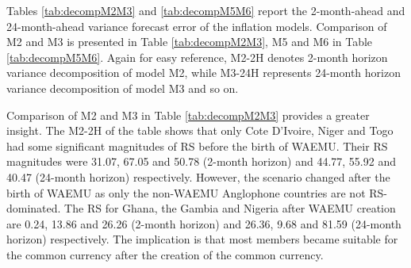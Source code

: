 \documentclass[]{article}
\begin{document}
Tables \ref{tab:decompM2M3} and \ref{tab:decompM5M6} report the 2-month-ahead and 24-month-ahead variance forecast error of the inflation models. Comparison of M2 and M3 is presented in Table \ref{tab:decompM2M3}, M5 and M6 in Table \ref{tab:decompM5M6}. Again for easy reference, M2-2H denotes 2-month horizon variance decomposition of model M2, while M3-24H represents 24-month horizon variance decomposition of model M3 and so on.

Comparison of M2 and M3 in Table \ref{tab:decompM2M3} provides a greater insight. The M2-2H of the table shows that only Cote D'Ivoire, Niger and Togo had some significant magnitudes of RS before the birth of WAEMU. Their RS magnitudes were 31.07, 67.05 and 50.78 (2-month horizon) and 44.77, 55.92 and 40.47 (24-month horizon) respectively. However, the scenario changed after the birth of WAEMU as only the non-WAEMU Anglophone countries are not RS-dominated. The RS for Ghana, the Gambia and Nigeria after WAEMU creation are 0.24, 13.86 and 26.26 (2-month horizon) and 26.36, 9.68 and 81.59 (24-month horizon) respectively. The implication is that most members became suitable for the common currency after the creation of the common currency.
\end{document}
